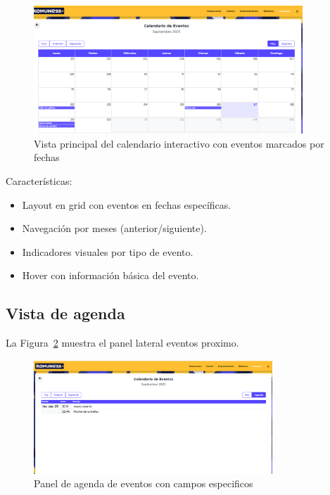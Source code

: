 \begin{figure}[H]
  \centering
  \includegraphics[width=0.9\textwidth]{project/images/imagen4.png}
  \caption{Vista principal del calendario interactivo con eventos marcados por fechas}
  \label{fig:calendario-vista}
\end{figure}

Características:
\begin{itemize}
  \item Layout en grid con eventos en fechas específicas.
  \item Navegación por meses (anterior/siguiente).
  \item Indicadores visuales por tipo de evento.
  \item Hover con información básica del evento.
\end{itemize}

\subsection{Vista de agenda}

La Figura~\ref{fig:calendario-detalle} muestra el panel lateral  eventos proximo.

\begin{figure}[H]
  \centering
  \includegraphics[width=0.8\textwidth]{project/images/imagen5.PNG}
  \caption{Panel de agenda de eventos con campos especificos}
  \label{fig:calendario-detalle}
\end{figure}

